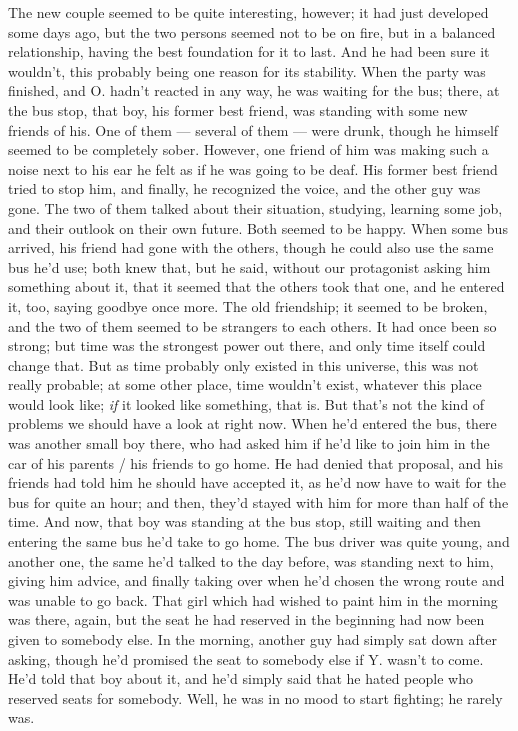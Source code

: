 The new couple seemed to be quite interesting, however; it had just developed some days ago, but the two persons seemed not to be on fire, but in a balanced relationship, having the best foundation for it to last. 
And he had been sure it wouldn't, this probably being one reason for its stability. 
When the party was finished, and O. hadn't reacted in any way, he was waiting for the bus; there, at the bus stop, that boy, his former best friend, was standing with some new friends of his. One of them --- several of them --- were drunk, though he himself seemed to be completely sober. However, one friend of him was making such a noise next to his ear he felt as if he was going to be deaf. His former best friend tried to stop him, and finally, he recognized the voice, and the other guy was gone. The two of them talked about their situation, studying, learning some job, and their outlook on their own future. 
Both seemed to be happy. 
When some bus arrived, his friend had gone with the others, though he could also use the same bus he'd use; both knew that, but he said, without our protagonist asking him something about it, that it seemed that the others took that one, and he entered it, too, saying goodbye once more. 
The old friendship; it seemed to be broken, and the two of them seemed to be strangers to each others. It had once been so strong; but time was the strongest power out there, and only time itself could change that. But as time probably only existed in this universe, this was not really probable; at some other place, time wouldn't exist, whatever this place would look like; \emph{if} it looked like something, that is. 
But that's not the kind of problems we should have a look at right now. When he'd entered the bus, there was another small boy there, who had asked him if he'd like to join him in the car of his parents / his friends to go home. He had denied that proposal, and his friends had told him he should have accepted it, as he'd now have to wait for the bus for quite an hour; and then, they'd stayed with him for more than half of the time. 
And now, that boy was standing at the bus stop, still waiting and then entering the same bus he'd take to go home. The bus driver was quite young, and another one, the same he'd talked to the day before, was standing next to him, giving him advice, and finally taking over when he'd chosen the wrong route and was unable to go back. That girl which had wished to paint him in the morning was there, again, but the seat he had reserved in the beginning had now been given to somebody else. In the morning, another guy had simply sat down after asking, though he'd promised the seat to somebody else if Y. wasn't to come. He'd told that boy about it, and he'd simply said that he hated people who reserved seats for somebody. Well, he was in no mood to start fighting; he rarely was. 
